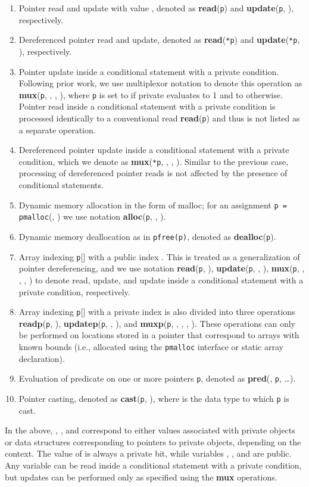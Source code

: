 \documentclass[11pt]{article}
\begin{document}
\begin{enumerate}
  \item Pointer read and update with value , denoted as 
    \textbf{read}(\texttt{p}) and \textbf{update}(\texttt{p}, ),
    respectively. 
  \item Dereferenced pointer read and update, denoted as
    \textbf{read}(\texttt{*p}) and \textbf{update}(\texttt{*p}, ),
    respectively.
  \item Pointer update inside a conditional statement with a private
    condition. Following prior work, we use multiplexor notation to denote
    this operation as \textbf{mux}(\texttt{p}, , , ), where
    \texttt{p} is set to  if private  evaluates to 1 and to 
    otherwise. Pointer read inside a conditional statement with a private
    condition is processed identically to a conventional read
    \textbf{read}(\texttt{p}) and thus is not listed as a separate
    operation. 
  \item Dereferenced pointer update inside a conditional statement with a
    private condition, which we denote as \textbf{mux}(\texttt{*p}, ,
    , ). Similar to the previous case, processing of dereferenced
    pointer reads is not affected by the presence of conditional statements.
  \item Dynamic memory allocation in the form of malloc; for an assignment
    \texttt{p = pmalloc}(, ) we use notation
    \textbf{alloc}(\texttt{p}, , ). 
  \item Dynamic memory deallocation as in \texttt{pfree(p)},
    denoted as \textbf{dealloc}(\texttt{p}).
  \item Array indexing \texttt{p}[] with a public index . This is
    treated as a generalization of pointer dereferencing, and we use notation
    \textbf{read}(\texttt{p}, ), \textbf{update}(\texttt{p}, , ),
    \textbf{mux}(\texttt{p}, , , , ) to denote read,
    update, and update inside a conditional statement with a private
    condition, respectively.
  \item Array indexing \texttt{p}[] with a private index  is also
    divided into three operations \textbf{readp}(\texttt{p}, ),
    \textbf{updatep}(\texttt{p}, , ), and \textbf{muxp}(\texttt{p},
    , , , ). These operations can only be performed on
    locations stored in a pointer that correspond to arrays with known
    bounds (i.e., allocated using the \texttt{pmalloc} interface or static
    array declaration). 
  \item Evaluation of predicate  on one or more pointers \texttt{p}, denoted as \textbf{pred}(, \texttt{p}, {\ldots}).
  \item Pointer casting, denoted as \textbf{cast}(\texttt{p},
    ), where  is the data type to which \texttt{p} is cast.
\end{enumerate}
In the above, , , and  correspond to either values associated
with private objects or data structures corresponding to pointers to private
objects, depending on the context. The value of  is always a private
bit, while variables , , and  are public. Any variable can be
read inside a conditional statement with a private condition, but updates
can be performed only as specified using the \textbf{mux} operations.
\end{document}

